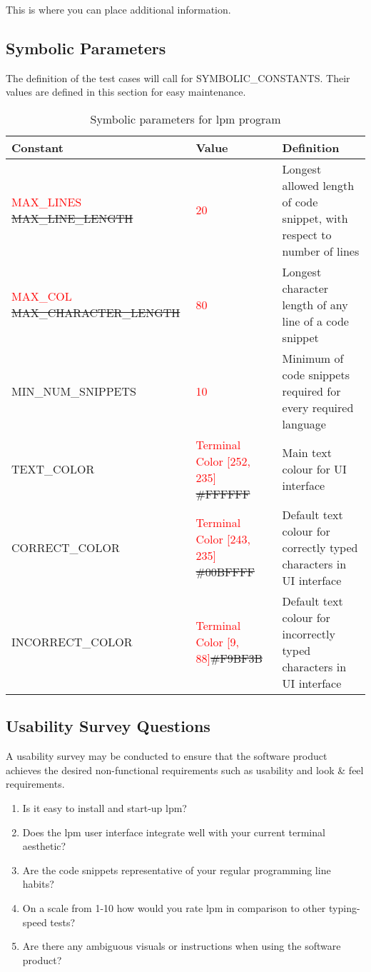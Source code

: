 \documentclass[12pt, titlepage]{article}
\begin{document}
This is where you can place additional information.

\subsection{Symbolic Parameters}

The definition of the test cases will call for SYMBOLIC\_CONSTANTS.
Their values are defined in this section for easy maintenance.

\begin{table}[!hbtp]
    \centering
    \begin{tabular}{|p{6cm}|p{2cm}|p{7cm}|}
    \hline
    Constant & Value & Definition \\
    \hline
    \textcolor{red}{MAX\_LINES} \sout{MAX\_LINE\_LENGTH} & \textcolor{red}{20} & Longest allowed length of code snippet, with respect to number of lines \\
    \hline
    \textcolor{red}{MAX\_COL} \sout{MAX\_CHARACTER\_LENGTH} & \textcolor{red}{80} & Longest character length of any line of a code snippet \\
    \hline
    MIN\_NUM\_SNIPPETS & \textcolor{red}{10} & Minimum of code snippets required for every required language \\
    \hline
    TEXT\_COLOR & \textcolor{red}{Terminal Color [252, 235]} \sout{\#FFFFFF} & Main text colour for UI interface \\
    \hline
    CORRECT\_COLOR & \textcolor{red}{Terminal Color [243, 235]} \sout{\#00BFFFF} & Default text colour for correctly typed characters in UI interface \\
    \hline
    INCORRECT\_COLOR & \textcolor{red}{Terminal Color [9, 88]}\sout{\#F9BF3B} & Default text colour for incorrectly typed characters in UI interface \\
    \hline
    \end{tabular}

    \caption{Symbolic parameters for lpm program}
    \label{tab:my_label}
\end{table}

\subsection{Usability Survey Questions}

A usability survey may be conducted to ensure that the software product achieves the desired non-functional requirements such as usability and look \& feel requirements.
\begin{enumerate}
    \item Is it easy to install and start-up lpm?
    \item Does the lpm user interface integrate well with your current terminal aesthetic?
    \item Are the code snippets representative of your regular programming line habits?
    \item On a scale from 1-10 how would you rate lpm in comparison to other typing-speed tests?
    \item Are there any ambiguous visuals or instructions when using the software product?
\end{enumerate}
\end{document}
